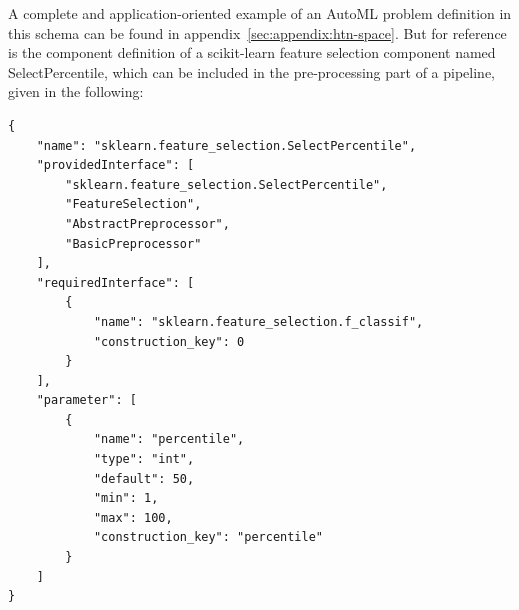 A complete and application-oriented example of an AutoML problem definition in this schema can be found in appendix~\ref{sec:appendix:htn-space}.
But for reference is the component definition of a scikit-learn feature selection component named SelectPercentile, which can be included in the pre-processing part of a pipeline, given in the following:
\begin{verbatim}
{
    "name": "sklearn.feature_selection.SelectPercentile",
    "providedInterface": [
        "sklearn.feature_selection.SelectPercentile",
        "FeatureSelection",
        "AbstractPreprocessor",
        "BasicPreprocessor"
    ],
    "requiredInterface": [
        {
            "name": "sklearn.feature_selection.f_classif",
            "construction_key": 0
        }
    ],
    "parameter": [
        {
            "name": "percentile",
            "type": "int",
            "default": 50,
            "min": 1,
            "max": 100,
            "construction_key": "percentile"
        }
    ]
}
\end{verbatim}

